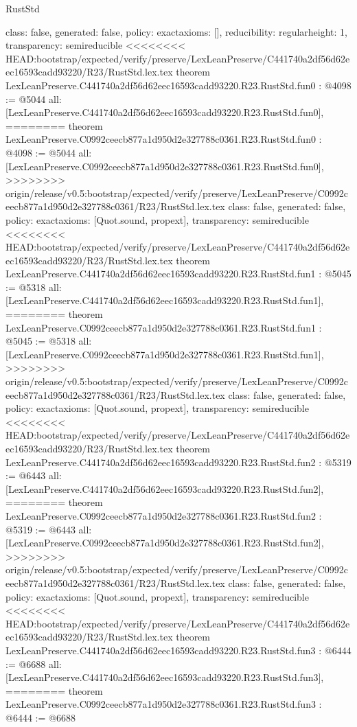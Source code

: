 \begin{lexlean}{RustStd}
\begin{coremodule}
{\begin{coremodule}
{{{  class: false,
  generated: false,
  policy: exact{axioms: []},
  reducibility: regular{height: 1},
  transparency: semireducible
}
<<<<<<<< HEAD:bootstrap/expected/verify/preserve/LexLeanPreserve/C441740a2df56d62eec16593cadd93220/R23/RustStd.lex.tex
theorem LexLeanPreserve.C441740a2df56d62eec16593cadd93220.R23.RustStd.fun0 : @4098 := @5044 {
  all: [LexLeanPreserve.C441740a2df56d62eec16593cadd93220.R23.RustStd.fun0],
========
theorem LexLeanPreserve.C0992ceecb877a1d950d2e327788c0361.R23.RustStd.fun0 : @4098 := @5044 {
  all: [LexLeanPreserve.C0992ceecb877a1d950d2e327788c0361.R23.RustStd.fun0],
>>>>>>>> origin/release/v0.5:bootstrap/expected/verify/preserve/LexLeanPreserve/C0992ceecb877a1d950d2e327788c0361/R23/RustStd.lex.tex
  class: false,
  generated: false,
  policy: exact{axioms: [Quot.sound, propext]},
  transparency: semireducible
}
<<<<<<<< HEAD:bootstrap/expected/verify/preserve/LexLeanPreserve/C441740a2df56d62eec16593cadd93220/R23/RustStd.lex.tex
theorem LexLeanPreserve.C441740a2df56d62eec16593cadd93220.R23.RustStd.fun1 : @5045 := @5318 {
  all: [LexLeanPreserve.C441740a2df56d62eec16593cadd93220.R23.RustStd.fun1],
========
theorem LexLeanPreserve.C0992ceecb877a1d950d2e327788c0361.R23.RustStd.fun1 : @5045 := @5318 {
  all: [LexLeanPreserve.C0992ceecb877a1d950d2e327788c0361.R23.RustStd.fun1],
>>>>>>>> origin/release/v0.5:bootstrap/expected/verify/preserve/LexLeanPreserve/C0992ceecb877a1d950d2e327788c0361/R23/RustStd.lex.tex
  class: false,
  generated: false,
  policy: exact{axioms: [Quot.sound, propext]},
  transparency: semireducible
}
<<<<<<<< HEAD:bootstrap/expected/verify/preserve/LexLeanPreserve/C441740a2df56d62eec16593cadd93220/R23/RustStd.lex.tex
theorem LexLeanPreserve.C441740a2df56d62eec16593cadd93220.R23.RustStd.fun2 : @5319 := @6443 {
  all: [LexLeanPreserve.C441740a2df56d62eec16593cadd93220.R23.RustStd.fun2],
========
theorem LexLeanPreserve.C0992ceecb877a1d950d2e327788c0361.R23.RustStd.fun2 : @5319 := @6443 {
  all: [LexLeanPreserve.C0992ceecb877a1d950d2e327788c0361.R23.RustStd.fun2],
>>>>>>>> origin/release/v0.5:bootstrap/expected/verify/preserve/LexLeanPreserve/C0992ceecb877a1d950d2e327788c0361/R23/RustStd.lex.tex
  class: false,
  generated: false,
  policy: exact{axioms: [Quot.sound, propext]},
  transparency: semireducible
}
<<<<<<<< HEAD:bootstrap/expected/verify/preserve/LexLeanPreserve/C441740a2df56d62eec16593cadd93220/R23/RustStd.lex.tex
theorem LexLeanPreserve.C441740a2df56d62eec16593cadd93220.R23.RustStd.fun3 : @6444 := @6688 {
  all: [LexLeanPreserve.C441740a2df56d62eec16593cadd93220.R23.RustStd.fun3],
========
theorem LexLeanPreserve.C0992ceecb877a1d950d2e327788c0361.R23.RustStd.fun3 : @6444 := @6688 {
}}}}}}}
\end{coremodule}}
\end{coremodule}
\end{lexlean}
